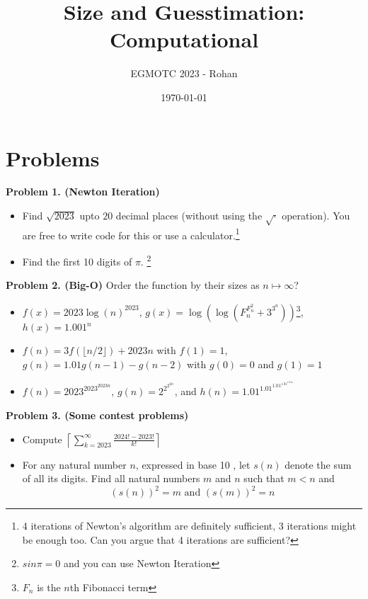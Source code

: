 \documentclass[12pt]{article}
\title{Size and Guesstimation: Computational}
\author{EGMOTC 2023 - Rohan}
\date{\today}
\begin{document}
\maketitle

\newcommand{\localtextbulletone}{\textcolor{black}{\raisebox{.45ex}{\rule{.6ex}{.6ex}}}}
\renewcommand{\labelitemi}{\localtextbulletone}

\section*{Problems}
\vspace{1cm}
\thispagestyle{empty}


\textbf{Problem 1. (Newton Iteration)} 
\begin{itemize}
    \item Find $\sqrt{2023}$ upto $20$ decimal places (without using the $\sqrt{\cdot{}}$ operation). You are free to write code for this or use a calculator.\footnote{4 iterations of Newton's algorithm are definitely sufficient, 3 iterations might be enough too. Can you argue that 4 iterations are sufficient?}
    \item Find the first 10 digits of $\pi$. \footnote{$sin \pi=0$ and you can use Newton Iteration}
\end{itemize}

\textbf{Problem 2. (Big-O)} Order the function by their sizes as $n\mapsto \infty$?
\begin{itemize}
    \item $f(x)=2023\log(n)^{2023}$, $g(x)=\log(\log(F_n^{F_n^2}+3^{3^n}))$\footnote{$F_n$ is the $n$th Fibonacci term}, $h(x)=1.001^n$
    \item $f(n)=3f\left(\lfloor{} n/2\rfloor{}\right)+2023n$ with $f(1)=1$, $g(n)=1.01g(n-1)-g(n-2)$ with $g(0)=0$ and $g(1)=1$
    \item $f(n)=2023^{2023^{2023n}}$, $g(n)=2^{2^{2^{2n}}}$, and $h(n)=1.01^{1.01^{1.01^{1.01^{1.01n}}}}$  
\end{itemize}  

\textbf{Problem 3. (Some contest problems)}
\begin{itemize}
    \item Compute $\left\lceil\displaystyle\sum_{k=2023}^{\infty}\frac{2024!-2023!}{k!}\right\rceil$
    \item For any natural number $n$, expressed in base 10 , let $s(n)$ denote the sum of all its digits. Find all natural numbers $m$ and $n$ such that $m<n$ and
    \[(s(n))^2=m \text { and }(s(m))^2=n\]
\end{itemize} 
\end{document}
